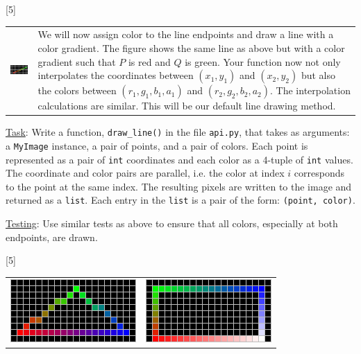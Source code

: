 \documentclass[addpoints]{exam}
\begin{document}
\begin{questions}
  [5]

  \noindent\begin{tabularx}{\linewidth}{lX}
    \includegraphics[align=t]{dda-color} &
    We will now assign color to the line endpoints and draw a line with a color gradient. The figure shows the same line as above but with a color gradient such that $P$ is red and $Q$ is green. Your function now not only interpolates the coordinates between $(x_1,y_1)$ and  $(x_2,y_2)$ but also the colors between $(r_1, g_1, b_1, a_1)$ and  $(r_2, g_2, b_2, a_2)$. The interpolation calculations are similar. This will be our default line drawing method.
  \end{tabularx}
  \underline{Task}: Write a function, \texttt{draw\_line()} in the file \texttt{api.py}, that takes as arguments: a \texttt{MyImage} instance, a pair of points, and a pair of colors. Each point is represented as a pair of \texttt{int} coordinates and each color as a 4-tuple of \texttt{int} values. The coordinate and color pairs are parallel, i.e. the color at index $i$ corresponds to the point at the same index. The resulting pixels are written to the image and returned as a \texttt{list}. Each entry in the \texttt{list} is a pair of the form: \texttt{(point, color)}.

  \underline{Testing}: Use similar tests as above to ensure that all colors, especially at both endpoints, are drawn.

  [5]

  \begin{center}
    \begin{tabular}{cc}
      \includegraphics[align=t]{tri} & \includegraphics[align=t]{quad}
    \end{tabular}
  \end{center}
  

\end{questions}
\end{document}
